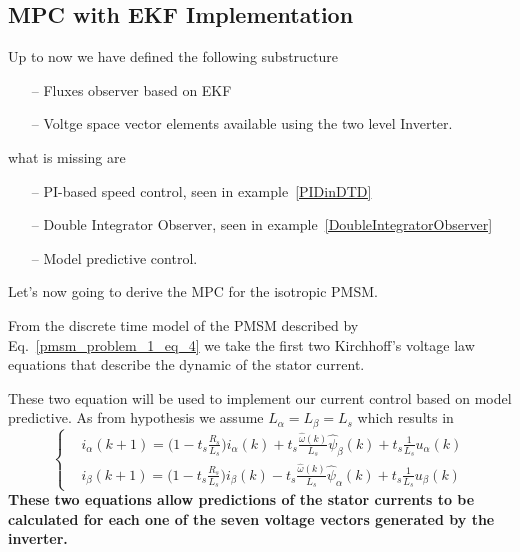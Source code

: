 \documentclass[11pt,a4paper,oneside]{book}
\numberwithin{equation}{section}
\theoremstyle{it}
\theoremstyle{definition}
\begin{document}
\subsection{MPC with EKF Implementation}
Up to now we have defined the following substructure
\begin{itemize}
	\item[--] Fluxes observer based on EKF 
	\item[--] Voltge space vector elements available using the two level Inverter.
\end{itemize}
what is missing are 
\begin{itemize}
	\item[--] PI-based speed control, seen in example~\ref{PIDinDTD}
	\item[--] Double Integrator Observer, seen in example~\ref{DoubleIntegratorObserver}
	\item[--] Model predictive control.
\end{itemize}
Let's now going to derive the MPC for the isotropic PMSM.

From the discrete time model of the PMSM described by Eq.~\eqref{pmsm_problem_1_eq_4} we take the first two Kirchhoff's voltage law equations that describe the dynamic of the stator current. 

These two equation will be used to implement our current control based on model predictive. As from hypothesis we assume $L_\alpha=L_\beta=L_s$ which results in
\begin{equation}\label{pmsm_problem_1_eq_22}
	\left\lbrace \begin{aligned}
		&i_\alpha(k+1)=\Big(1-t_s\frac{R_s}{L_s}\Big)i_\alpha(k) + 
		t_s\frac{\hat{\omega}(k)}{L_s}\hat{\psi}_\beta(k) + 
		t_s\frac{1}{L_s}u_\alpha(k) \\[6pt] 
		&i_\beta(k+1)=\Big(1-t_s\frac{R_s}{L_s}\Big)i_\beta(k) - 
		t_s\frac{\hat{\omega}(k)}{L_s}\hat{\psi}_\alpha(k) + 
		t_s\frac{1}{L_s}u_\beta(k)
	\end{aligned}\right. 
\end{equation}
\textbf{These two equations allow predictions of the stator currents to be calculated for 
	each one of the seven voltage vectors generated by the inverter.}
\end{document}
